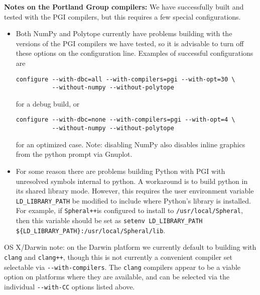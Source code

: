 \documentclass{article}
\newcommand{\Spheral}{{\tt Spheral++}}
\begin{document}
{\bf Notes on the Portland Group compilers:}\newline
We have successfully built and tested with the PGI compilers, but this requires a few special configurations.
\begin{itemize}
\item Both NumPy and Polytope currently have problems building with the versions of the PGI compilers we have tested, so it is advisable to turn off these options on the configuration line.  Examples of successful configurations are
\begin{verbatim}
configure --with-dbc=all --with-compilers=pgi --with-opt=30 \
          --without-numpy --without-polytope
\end{verbatim}
for a debug build, or 
\begin{verbatim}
configure --with-dbc=none --with-compilers=pgi --with-opt=4 \
          --without-numpy --without-polytope
\end{verbatim}
for an optimized case.  Note: disabling NumPy also disables inline graphics from the python prompt via Gnuplot.
\item For some reason there are problems building Python with PGI with unresolved symbols internal to python.  A workaround is to build python in its shared library mode.  However, this requires the user environment variable \verb.LD_LIBRARY_PATH. be modified to include where Python's library is installed.  For example, if \Spheral is configured to install to {\tt /usr/local/Spheral}, then this variable should be set as \newline
\verb.setenv LD_LIBRARY_PATH ${LD_LIBRARY_PATH}:/usr/local/Spheral/lib..
\end{itemize}

OS X/Darwin note: on the Darwin platform we currently default to building with {\tt clang} and {\tt clang++}, though this is not currently a convenient compiler set selectable via \verb.--with-compilers..  The {\tt clang} compilers appear to be a viable option on platforms where they are available, and can be selected via the individual \verb.--with-CC. options listed above.
\end{document}
